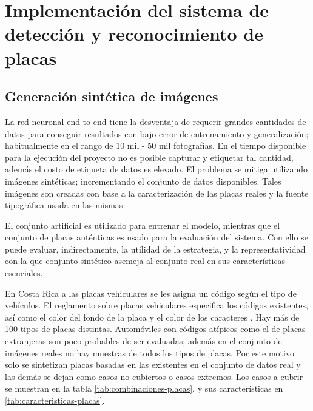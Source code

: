 \chapter{Implementación del sistema de detección y reconocimiento de placas}
\label{ch:solucion}

\section{Generación sintética de imágenes}

La red neuronal end-to-end tiene la desventaja de requerir grandes cantidades de datos
para conseguir resultados con bajo error de entrenamiento y generalización;
habitualmente en el rango de 10 mil - 50 mil fotografías. 
En el tiempo disponible para la ejecución del proyecto no es posible 
capturar y etiquetar tal cantidad, además el costo de etiqueta de datos es 
elevado. El problema se mitiga utilizando imágenes sintéticas;
incrementando el conjunto de datos disponibles. 
Tales imágenes son creadas con base a la caracterización de las placas reales
y la fuente tipográfica usada en las mismas.

El conjunto artificial es utilizado para entrenar el modelo,
mientras que el conjunto de placas auténticas es usado
para la evaluación del sistema. Con ello se puede evaluar, indirectamente,
la utilidad de la estrategia, y la representatividad con la que conjunto sintético
asemeja al conjunto real en sus características esenciales.

En Costa Rica a las placas vehiculares se les asigna un código según el tipo de vehículos.
El reglamento sobre placas vehiculares especifica los códigos existentes, así como el color
del fondo de la placa y el color de los caracteres \cite{art97placasvehiculares}. Hay
más de 100 tipos de placas distintas.
Automóviles con códigos atípicos como el de placas extranjeras son poco probables de ser evaluadas;
además en el conjunto de imágenes reales no hay muestras de todos los tipos de placas.
Por este motivo solo se sintetizan placas basadas en las existentes en el conjunto de datos real
y las demás se dejan como casos no cubiertos o casos extremos. Los casos a cubrir se
muestran en la tabla \ref{tab:combinaciones-placas},
y sus características en \ref{tab:caracteristicas-placas}.

